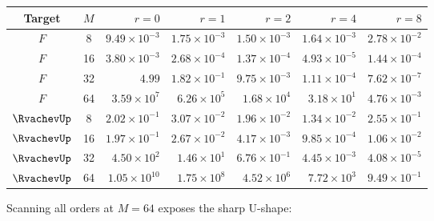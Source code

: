 \begin{center}
\small
\setlength{\tabcolsep}{4.5pt}
\begin{tabular}{@{}ccrrrrr@{}}
\toprule
Target & $M$ & $r=0$ & $r=1$ & $r=2$ & $r=4$ & $r=8$\\
\midrule
$F$ & 8  & $9.49\times10^{-3}$ & $1.75\times10^{-3}$ & $1.50\times10^{-3}$ & $1.64\times10^{-3}$ & $2.78\times10^{-2}$\\
$F$ & 16 & $3.80\times10^{-3}$ & $2.68\times10^{-4}$ & $1.37\times10^{-4}$ & $4.93\times10^{-5}$ & $1.44\times10^{-4}$\\
$F$ & 32 & $4.99$ & $1.82\times10^{-1}$ & $9.75\times10^{-3}$ & $1.11\times10^{-4}$ & $7.62\times10^{-7}$\\
$F$ & 64 & $3.59\times10^{7}$ & $6.26\times10^{5}$ & $1.68\times10^{4}$ & $3.18\times10^{1}$ & $4.76\times10^{-3}$\\
\midrule
$\RvachevUp$ & 8  & $2.02\times10^{-1}$ & $3.07\times10^{-2}$ & $1.96\times10^{-2}$ & $1.34\times10^{-2}$ & $2.55\times10^{-1}$\\
$\RvachevUp$ & 16 & $1.97\times10^{-1}$ & $2.67\times10^{-2}$ & $4.17\times10^{-3}$ & $9.85\times10^{-4}$ & $1.06\times10^{-2}$\\
$\RvachevUp$ & 32 & $4.50\times10^{2}$ & $1.46\times10^{1}$ & $6.76\times10^{-1}$ & $4.45\times10^{-3}$ & $4.08\times10^{-5}$\\
$\RvachevUp$ & 64 & $1.05\times10^{10}$ & $1.75\times10^{8}$ & $4.52\times10^{6}$ & $7.72\times10^{3}$ & $9.49\times10^{-1}$\\
\bottomrule
\end{tabular}
\label{tab:fixed-errors}
\end{center}

Scanning all orders at $M=64$ exposes the sharp U-shape:

